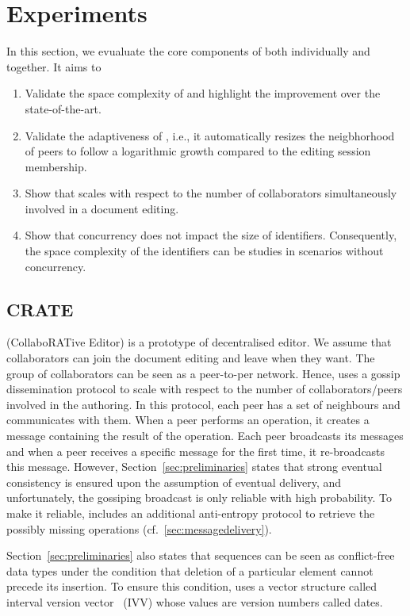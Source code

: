 \section{Experiments}
\label{sec:experiments}

In this section, we evualuate the core components of \CRATE both individually
and together. It aims to
\begin{enumerate}[leftmargin=*]
\item Validate the space complexity of \LSEQ and highlight the improvement
  over the state-of-the-art.
\item Validate the adaptiveness of \SPRAY, i.e., it automatically resizes the
  neigbhorhood of peers to follow a logarithmic growth compared to the editing
  session membership.
\item Show that \CRATE scales with respect to the number of
  collaborators simultaneously involved in a document editing.
\item Show that concurrency does not impact the size of
  identifiers. Consequently, the space complexity of the identifiers can be
  studies in scenarios without concurrency.
\end{enumerate}

\subsection{CRATE}
\label{subsec:crdt}
\CRATE (CollaboRATive Editor) is a prototype of decentralised editor. We
assume that collaborators can join the document editing and leave when they
want. The group of collaborators can be seen as a peer-to-per network. Hence,
\CRATE uses a gossip dissemination protocol to scale with respect to the
number of collaborators/peers involved in the authoring. In this protocol, each
peer has a set of neighbours and communicates with them. When a peer performs
an operation, it creates a message containing the result of the operation. Each
peer broadcasts its messages and when a peer receives a specific message for
the first time, it re-broadcasts this message. However,
Section~\ref{sec:preliminaries} states that strong eventual consistency is
ensured upon the assumption of eventual delivery, and unfortunately, the
gossiping broadcast is only reliable with high probability. To make it
reliable, \CRATE includes an additional anti-entropy protocol to
retrieve the possibly missing operations (cf.~\ref{sec:messagedelivery}).

Section~\ref{sec:preliminaries} also states that sequences can be seen as
conflict-free data types under the condition that deletion of a particular
element cannot precede its insertion. To ensure this condition, \CRATE
uses a vector structure called interval version
vector~\cite{mukund2014optimized} (IVV) whose values are version numbers called
dates.

